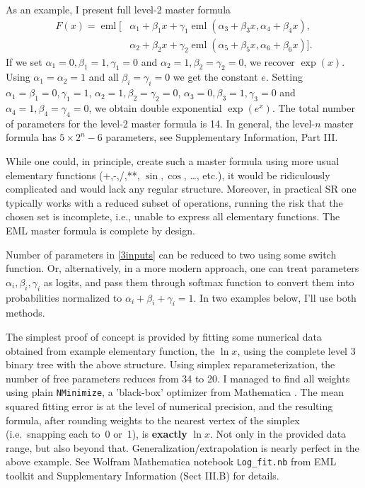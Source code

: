 \documentclass[12pt]{article}
\DeclareMathOperator{\eml}{eml}
\begin{document}
As an example, I present full level-2 master formula
\begin{align*}
F(x) = \eml \biggl[
&\alpha_1 + \beta_1 x + \gamma_1  \eml{(\alpha_3 + \beta_3 x,\alpha_4 + \beta_4 x)},\\
&\alpha_2 + \beta_2 x + \gamma_2  \eml{(\alpha_5 + \beta_5 x,\alpha_6 + \beta_6 x)}
\biggr].
\end{align*}
If we set $\alpha_1=0, \beta_1=1, \gamma_1=0$ and $\alpha_2=1, \beta_2=\gamma_2=0$, we recover $\exp(x)$. 
Using $\alpha_1=\alpha_2=1$ and all $\beta_i=\gamma_i=0$ we get the constant $e$. Setting $\alpha_1=\beta_1=0, \gamma_1=1$, $\alpha_2=1, \beta_2=\gamma_2=0$, $\alpha_3=0, \beta_3=1, \gamma_3=0$ and $\alpha_4=1, \beta_4=\gamma_4=0$, we obtain double exponential $\exp{(e^x)}$. The total number of parameters for the level-2 master formula is 14. In general, the level-$n$ master formula has $5 \times 2^n-6$ parameters, see Supplementary Information, Part III. 


While one could, in principle, create such a master formula using more usual elementary functions (+,-,/,**, $\sin, \cos$, \ldots, etc.), it would be ridiculously complicated and would lack any regular structure. Moreover, in practical SR one typically works with a reduced subset of operations, running the risk that the chosen set is incomplete, i.e., unable to express all elementary functions. The EML master formula is complete by design.


Number of parameters in \eqref{3inputs} can be reduced to two using some switch function. Or, alternatively, in a more modern approach, one can treat parameters $\alpha_i,\beta_i, \gamma_i$ as logits, and pass them through softmax function \cite{jang2017categorical} to convert them into probabilities normalized to
$\alpha_i+\beta_i+\gamma_i=1$. In two examples below, I'll use both methods. 


The simplest proof of concept is provided by fitting some numerical data obtained from example elementary function,  the $\ln{x}$, using the complete level 3 binary tree with the above structure. Using simplex reparameterization, the number of free parameters reduces from 34 to 20. I managed to find all weights using plain \texttt{NMinimize}, a 'black-box' optimizer from Mathematica \cite{WolframMathematica}. The mean squared fitting error is at the level of numerical precision, and the resulting formula, after rounding weights to the nearest vertex of the simplex (i.e.\ snapping each to~0 or~1), is \textbf{exactly} $\ln{x}$. Not only in the provided data range, but also beyond that. Generalization/extrapolation is nearly perfect in the above example. See Wolfram Mathematica notebook \texttt{Log\_fit.nb} from EML toolkit \cite{SymbolicRegressionPackage} and Supplementary Information (Sect III.B) for details. 
\end{document}
